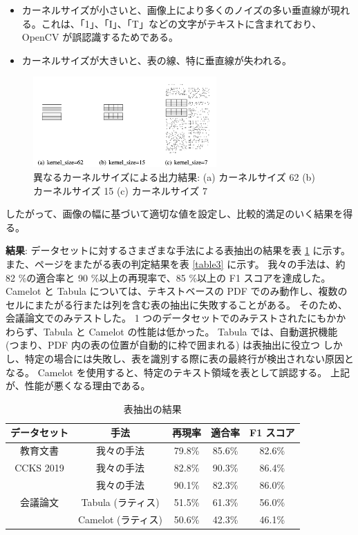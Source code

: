 \documentclass[uplatex, twocolumn,10pt]{jsarticle}
\begin{document}
\begin{itemize}
    \item カーネルサイズが小さいと、画像上により多くのノイズの多い垂直線が現れる。これは、「1」、「I」、「T」などの文字がテキストに含まれており、OpenCV が誤認識するためである。
    \item カーネルサイズが大きいと、表の線、特に垂直線が失われる。
\end{itemize}

\begin{figure}[tp]
    \begin{center}
        \includegraphics*[width=7cm]{image/master/master2/Fig4.png}
        \caption{異なるカーネルサイズによる出力結果: (a) カーネルサイズ 62 (b) カーネルサイズ 15 (c) カーネルサイズ 7}
        \label{fig4}
    \end{center}
\end{figure}

したがって、画像の幅に基づいて適切な値を設定し、比較的満足のいく結果を得る。

\textbf{結果}:
データセットに対するさまざまな手法による表抽出の結果を表 \ref{table2} に示す。
また、ページをまたがる表の判定結果を表 \ref{table3} に示す。
我々の手法は、約 82 \%の適合率と 90 \%以上の再現率で、85 \%以上の F1 スコアを達成した。
Camelot と Tabula については、テキストベースの PDF でのみ動作し、複数のセルにまたがる行または列を含む表の抽出に失敗することがある。
そのため、会議論文でのみテストした。
1 つのデータセットでのみテストされたにもかかわらず、Tabula と Camelot の性能は低かった。
Tabula では、自動選択機能 (つまり、PDF 内の表の位置が自動的に枠で囲まれる) は表抽出に役立つ
しかし、特定の場合には失敗し、表を識別する際に表の最終行が検出されない原因となる。
Camelot を使用すると、特定のテキスト領域を表として誤認する。
上記が、性能が悪くなる理由である。

\begin{table}[tp]
    \centering
    \caption{表抽出の結果}
    \label{table2}
    \begin{tabular}{ccccc}
        データセット & 手法 & 再現率 & 適合率 & F1 スコア \\
        \toprule
        教育文書 & 我々の手法 & 79.8\% & 85.6\% & 82.6\% \\
        CCKS 2019 & 我々の手法 & 82.8\% & 90.3\% & 86.4\% \\
        \multirow{3}{*}{会議論文} & 我々の手法 & 90.1\% & 82.3\% & 86.0\% \\
                                & Tabula (ラティス) & 51.5\% & 61.3\% & 56.0\% \\
                                & Camelot (ラティス) & 50.6\% & 42.3\% & 46.1\% \\
        \bottomrule
    \end{tabular}
\end{table}
\end{document}
